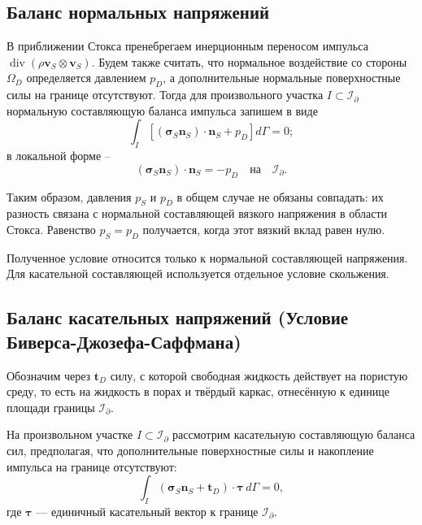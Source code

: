 \documentclass[a4paper,14pt]{extarticle}
\begin{document}
\subsection{Баланс нормальных напряжений}
В приближении Стокса пренебрегаем инерционным переносом
импульса $\operatorname{div}
(\rho\mathbf v_S\otimes\mathbf v_S)$. Будем также считать,
что нормальное воздействие со стороны $\Omega_D$
определяется давлением $p_D$, а дополнительные нормальные
поверхностные силы на границе отсутствуют. Тогда для
произвольного участка $I\subset\mathcal I_{\partial}$
нормальную составляющую баланса импульса запишем в виде
\begin{equation}
	\int_I
	\left[
		(\boldsymbol\sigma_S\mathbf n_S)\cdot\mathbf n_S
		+
		p_D
	\right]d\Gamma
	=
	0;
\end{equation}
в локальной форме --
\begin{equation}
	\boxed{
		(\boldsymbol\sigma_S\mathbf n_S)\cdot\mathbf n_S
		=
		-p_D
		\quad\text{на}\quad\mathcal I_{\partial}.
	}
	\label{eq:normal_stress}
\end{equation}

Таким образом, давления $p_S$ и $p_D$ в общем случае
не обязаны совпадать: их разность связана с нормальной
составляющей вязкого напряжения в области Стокса.
Равенство $p_S=p_D$ получается, когда этот вязкий вклад
равен нулю.

Полученное условие относится только к нормальной
составляющей напряжения. Для касательной составляющей
используется отдельное условие скольжения.




\subsection{Баланс касательных напряжений (Условие Биверса-Джозефа-Саффмана)}

Обозначим через $\mathbf t_D$ силу, с которой свободная жидкость
действует на пористую среду, то есть на жидкость в порах и твёрдый
каркас, отнесённую к единице площади границы $\mathcal I_\partial$.

На произвольном участке $I\subset\mathcal I_\partial$
рассмотрим касательную составляющую баланса сил, предполагая,
что дополнительные поверхностные силы и накопление импульса
на границе отсутствуют:
\begin{equation}
	\int_I
	\left(
		\boldsymbol\sigma_S\mathbf n_S
		+
		\mathbf t_D
	\right)
	\cdot\boldsymbol\tau\,d\Gamma
	=
	0,
\end{equation}
где $\boldsymbol\tau$ --- единичный касательный вектор
к границе $\mathcal I_\partial$.
\end{document}
